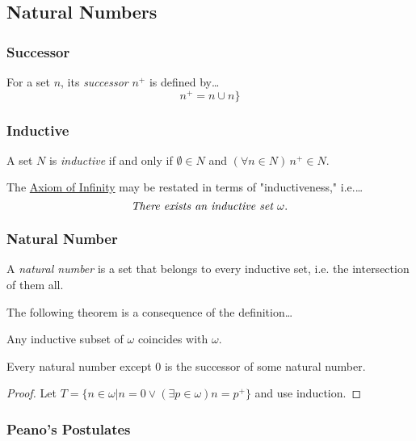 \subsection{Natural Numbers}\label{naturalnumbers}

\subsubsection{Successor}\label{successor}
For a set $n$, its \emph{successor} $n^+$ is defined by\dots
$$n^+ = n \cup n\}$$

\subsubsection{Inductive}\label{inductive}
A set $N$ is \emph{inductive}\label{inductive} if and only if $\emptyset \in N$ and $(\forall n \in N) \, n^+ \in N.$\newline

\noindent The \hyperref[statementofsetaxioms]{Axiom of Infinity} may be restated in terms of "inductiveness," i.e.\dots $$\emph{There exists an inductive set } \omega.$$

\subsubsection{Natural Number}
A \emph{natural number} is a set that belongs to every inductive set, i.e. the intersection of them all.\newline

\noindent The following theorem is a consequence of the definition\dots

\begin{theorem}
Any inductive subset of $\omega$ coincides with $\omega$.
\end{theorem}

\begin{proposition}
Every natural number except $0$ is the successor of some natural number.
\end{proposition}

\begin{proof}
Let $T = \{n \in \omega | n=0 \lor (\exists p \in \omega) n = p^+\}$ and use induction.
\end{proof}

\subsubsection{Peano's Postulates}

